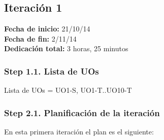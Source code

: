 \subsection{Iteración 1}
\label{it1}

\begin{flushleft}
\textbf{Fecha de inicio:} 21/10/14\\
\textbf{Fecha de fin:} 2/11/14\\
\textbf{Dedicación total:} 3 horas, 25 minutos\\
\end{flushleft}

\subsubsection{Step 1.1. Lista de UOs}
\label{it1:1.1}



Lista de UOs = {UO1-S, UO1-T..UO10-T}

\subsubsection{Step 2.1. Planificación de la iteración}
\label{it1:2.1}

En esta primera iteración el plan es el siguiente:

